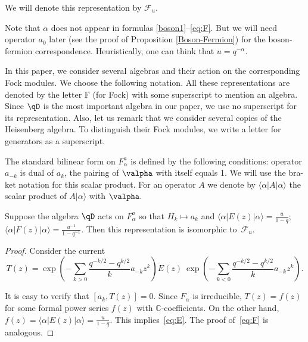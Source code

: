 We will denote this representation by $\mathcal{F}_u$.

\begin{Remark} \label{remark:NOalpha}Note that $\alpha$ does not appear in formulas \eqref{boson1}--\eqref{eq:F}. But we will need operator $a_0$ later (see the proof of Proposition \ref{Boson-Fermion}) for the boson-fermion correspondence. Heuristically, one can think that $u = q^{-\alpha}$.
\end{Remark}

\begin{Remark}In this paper, we consider several algebras and their action on the corresponding Fock modules. We choose the following notation. All these representations are denoted by the letter F (for Fock) with some superscript to mention an algebra. Since $\qD$ is the most important algebra in our paper, we use no superscript for its representation.
Also, let us remark that we consider several copies of the Heisenberg algebra. To distinguish their Fock modules, we write a letter for generators as a superscript.
\end{Remark}

The standard bilinear form on $F^a_{\alpha}$ is defined by the following conditions: operator $a_{-k}$ is dual of $a_k$, the pairing of $\valpha$ with itself equals 1. We will use the bra-ket notation for this scalar product. For an operator $A$ we denote by $\langle \alpha | A | \alpha \rangle$ the scalar product of $A | \alpha \rangle$ with $\valpha$.

\begin{Proposition}\label{Fock} Suppose the algebra $\qD$ acts on $F^a_{\alpha}$ so that $H_k \mapsto a_k$ and $\langle \alpha | E(z) | \alpha \rangle = \frac{u}{1-q}$; $\langle \alpha | F(z) | \alpha \rangle = \frac{u^{-1}}{1-q^{-1}}$.
Then this representation is isomorphic to~$\mathcal{F}_u$.
\end{Proposition}

\begin{proof} Consider the current \[T(z) =\exp \! \left( - \sum_{k>0} \frac{q^{-k/2}-q^{k/2}}{k} a_{-k} z^k \right) E(z) \ \exp \! \left( - \sum_{k<0}\frac{q^{-k/2}-q^{k/2}}{k} a_{-k} z^k \right).\]

It is easy to verify that $[a_k, T(z)] =0$. Since $F_{\alpha}$ is irreducible, $T(z)= f(z)$ for some formal power series $f(z)$ with $\mathbb{C}$-coefficients. On the other hand, $f(z) = \langle \alpha | E(z) | \alpha \rangle = \frac{u}{1-q} $. This implies~\eqref{eq:E}. The proof of~\eqref{eq:F} is analogous.
\end{proof}

